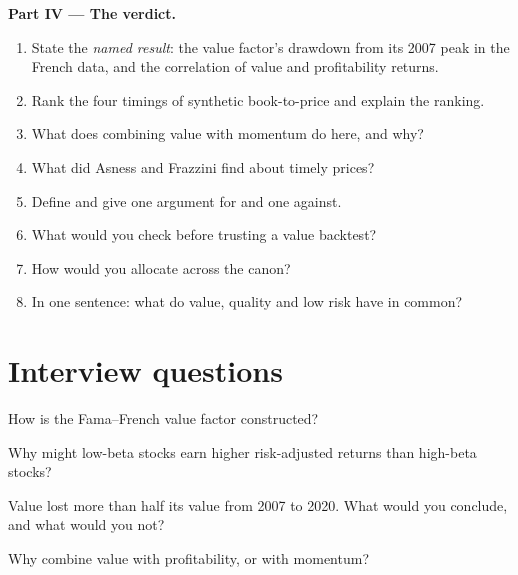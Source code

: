 \begin{problem}
\medskip\noindent\textbf{Part IV --- The verdict.}
\begin{enumerate}[resume]
\item State the \emph{named result}: the value factor's drawdown from its 2007 peak in the French data, and the correlation of value and profitability returns.
\item Rank the four timings of synthetic book-to-price and explain the ranking.
\item What does combining value with momentum do here, and why?
\item What did Asness and Frazzini find about timely prices?
\item Define  and give one argument for and one against.
\item What would you check before trusting a value backtest?
\item How would you allocate across the canon?
\item In one sentence: what do value, quality and low risk have in common?
\end{enumerate}
\end{problem}

\section{Interview questions}

\begin{interviewq}\label{iq:s1:value-quality-and-low-risk:1}
How is the Fama--French value factor constructed?
\end{interviewq}

\begin{interviewq}\label{iq:s1:value-quality-and-low-risk:2}
Why might low-beta stocks earn higher risk-adjusted returns than high-beta stocks?
\end{interviewq}

\begin{interviewq}\label{iq:s1:value-quality-and-low-risk:3}
Value lost more than half its value from 2007 to 2020. What would you conclude, and what would you not?
\end{interviewq}

\begin{interviewq}\label{iq:s1:value-quality-and-low-risk:4}
Why combine value with profitability, or with momentum?
\end{interviewq}

